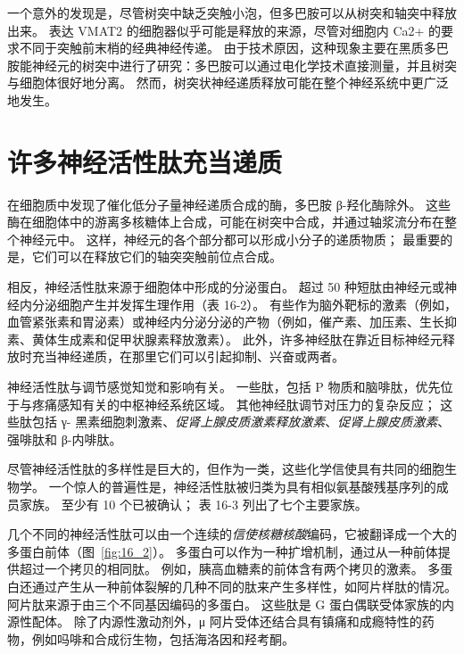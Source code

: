 一个意外的发现是，尽管树突中缺乏突触小泡，但多巴胺可以从树突和轴突中释放出来。
表达 VMAT2 的细胞器似乎可能是释放的来源，尽管对细胞内 Ca2+ 的要求不同于突触前末梢的经典神经传递。
由于技术原因，这种现象主要在黑质多巴胺能神经元的树突中进行了研究：多巴胺可以通过电化学技术直接测量，并且树突与细胞体很好地分离。
然而，树突状神经递质释放可能在整个神经系统中更广泛地发生。



\section{许多神经活性肽充当递质}

在细胞质中发现了催化低分子量神经递质合成的酶，多巴胺 β-羟化酶除外。
这些酶在细胞体中的游离多核糖体上合成，可能在树突中合成，并通过轴浆流分布在整个神经元中。
这样，神经元的各个部分都可以形成小分子的递质物质； 最重要的是，它们可以在释放它们的轴突突触前位点合成。


相反，神经活性肽来源于细胞体中形成的分泌蛋白。
超过 50 种短肽由神经元或神经内分泌细胞产生并发挥生理作用（表 16-2）。
有些作为脑外靶标的激素（例如，血管紧张素和胃泌素）或神经内分泌分泌的产物（例如，催产素、加压素、生长抑素、黄体生成素和促甲状腺素释放激素）。
此外，许多神经肽在靠近目标神经元释放时充当神经递质，在那里它们可以引起抑制、兴奋或两者。


神经活性肽与调节感觉知觉和影响有关。
一些肽，包括 P 物质和脑啡肽，优先位于与疼痛感知有关的中枢神经系统区域。
其他神经肽调节对压力的复杂反应；
这些肽包括 γ- 黑素细胞刺激素、\textit{促肾上腺皮质激素释放激素}、\textit{促肾上腺皮质激素}、强啡肽和 β-内啡肽。


尽管神经活性肽的多样性是巨大的，但作为一类，这些化学信使具有共同的细胞生物学。
一个惊人的普遍性是，神经活性肽被归类为具有相似氨基酸残基序列的成员家族。
至少有 10 个已被确认；
表 16-3 列出了七个主要家族。


几个不同的神经活性肽可以由一个连续的\textit{信使核糖核酸}编码，它被翻译成一个大的多蛋白前体（图~\ref{fig:16_2}）。
多蛋白可以作为一种扩增机制，通过从一种前体提供超过一个拷贝的相同肽。
例如，胰高血糖素的前体含有两个拷贝的激素。
多蛋白还通过产生从一种前体裂解的几种不同的肽来产生多样性，如阿片样肽的情况。
阿片肽来源于由三个不同基因编码的多蛋白。
这些肽是 G 蛋白偶联受体家族的内源性配体。
除了内源性激动剂外，μ 阿片受体还结合具有镇痛和成瘾特性的药物，例如吗啡和合成衍生物，包括海洛因和羟考酮。


